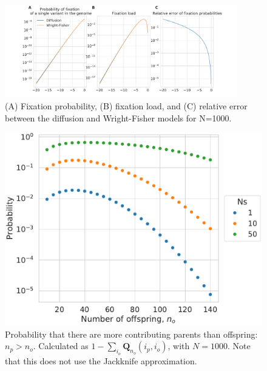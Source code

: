 \documentclass[review,nonatbib]{elsarticle}
\begin{document}
\begin{figure}[H]
  \centering
  \includegraphics[width=0.9\textwidth]{fig/fixation_rate_N_1000.pdf}

    \caption{(A) Fixation probability, (B) fixation load, and (C) relative error between the
    diffusion and Wright-Fisher models for N=1000.}

  \label{fig_apx_fixation_1000}

\end{figure}

\begin{figure}[H]
  \centering
  \includegraphics[width=\textwidth]{fig/missing.pdf}

  \caption{Probability that there are more contributing parents than offspring: $n_p > n_o$.
    Calculated as $1-\sum_{i_o} \mathbf{Q}_{n_o}{(i_p, i_o)}$, with $N=1000$. Note that this does
    not use the Jackknife approximation.}

  \label{fig_apx_missing}
\end{figure}
\end{document}
